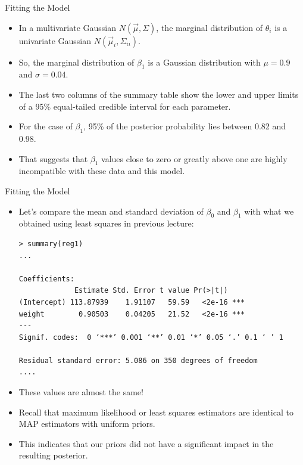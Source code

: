 \documentclass[handout]{beamer}
\begin{document}
\begin{frame}[fragile]{Fitting the Model}
\scriptsize{
\begin{itemize}
 
  \item In a multivariate Gaussian $N(\vec{\mu},\Sigma)$, the marginal distribution of $\theta_i$ is a univariate Gaussian $N(\vec{\mu}_i,\Sigma_{ii})$. 

  \item So, the marginal distribution of $\beta_1$ is a Gaussian distribution with $\mu=0.9$ and $\sigma=0.04$.
  
  \item The last two columns of the summary table show the lower and upper limits of a 95\% equal-tailed credible interval for each parameter.
  
  \item For the case of $\beta_1$, 95\% of the posterior probability lies between 0.82 and 0.98. 
  
  \item That suggests that $\beta_1$ values close to zero or greatly above one are highly incompatible with these data and this model.
 
\end{itemize}
 

 
}
\end{frame}


\begin{frame}[fragile]{Fitting the Model}
\scriptsize{
\begin{itemize}

\item Let's compare the mean and standard deviation of $\beta_0$ and $\beta_1$ with what we obtained using least squares in previous lecture:

\begin{verbatim}
> summary(reg1)
...

Coefficients:
             Estimate Std. Error t value Pr(>|t|)    
(Intercept) 113.87939    1.91107   59.59   <2e-16 ***
weight        0.90503    0.04205   21.52   <2e-16 ***
---
Signif. codes:  0 ‘***’ 0.001 ‘**’ 0.01 ‘*’ 0.05 ‘.’ 0.1 ‘ ’ 1

Residual standard error: 5.086 on 350 degrees of freedom
....
\end{verbatim}


\item These values are almost the same!

\item Recall that maximum likelihood or least squares estimators are identical to MAP estimators with uniform priors.

\item This indicates that our priors did not have a significant impact in the resulting posterior.



 
\end{itemize}
 

 
}
\end{frame}
\end{document}
